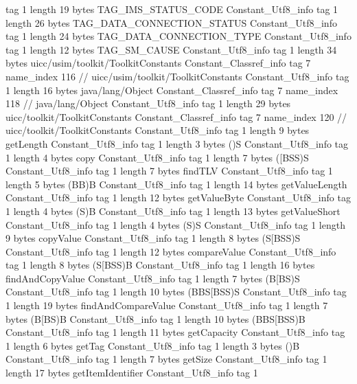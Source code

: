 {{{			tag	1
			length	19
			bytes	TAG_IMS_STATUS_CODE
		}
		Constant_Utf8_info {
			tag	1
			length	26
			bytes	TAG_DATA_CONNECTION_STATUS
		}
		Constant_Utf8_info {
			tag	1
			length	24
			bytes	TAG_DATA_CONNECTION_TYPE
		}
		Constant_Utf8_info {
			tag	1
			length	12
			bytes	TAG_SM_CAUSE
		}
		Constant_Utf8_info {
			tag	1
			length	34
			bytes	uicc/usim/toolkit/ToolkitConstants
		}
		Constant_Classref_info {
			tag	7
			name_index	116		// uicc/usim/toolkit/ToolkitConstants
		}
		Constant_Utf8_info {
			tag	1
			length	16
			bytes	java/lang/Object
		}
		Constant_Classref_info {
			tag	7
			name_index	118		// java/lang/Object
		}
		Constant_Utf8_info {
			tag	1
			length	29
			bytes	uicc/toolkit/ToolkitConstants
		}
		Constant_Classref_info {
			tag	7
			name_index	120		// uicc/toolkit/ToolkitConstants
		}
		Constant_Utf8_info {
			tag	1
			length	9
			bytes	getLength
		}
		Constant_Utf8_info {
			tag	1
			length	3
			bytes	()S
		}
		Constant_Utf8_info {
			tag	1
			length	4
			bytes	copy
		}
		Constant_Utf8_info {
			tag	1
			length	7
			bytes	([BSS)S
		}
		Constant_Utf8_info {
			tag	1
			length	7
			bytes	findTLV
		}
		Constant_Utf8_info {
			tag	1
			length	5
			bytes	(BB)B
		}
		Constant_Utf8_info {
			tag	1
			length	14
			bytes	getValueLength
		}
		Constant_Utf8_info {
			tag	1
			length	12
			bytes	getValueByte
		}
		Constant_Utf8_info {
			tag	1
			length	4
			bytes	(S)B
		}
		Constant_Utf8_info {
			tag	1
			length	13
			bytes	getValueShort
		}
		Constant_Utf8_info {
			tag	1
			length	4
			bytes	(S)S
		}
		Constant_Utf8_info {
			tag	1
			length	9
			bytes	copyValue
		}
		Constant_Utf8_info {
			tag	1
			length	8
			bytes	(S[BSS)S
		}
		Constant_Utf8_info {
			tag	1
			length	12
			bytes	compareValue
		}
		Constant_Utf8_info {
			tag	1
			length	8
			bytes	(S[BSS)B
		}
		Constant_Utf8_info {
			tag	1
			length	16
			bytes	findAndCopyValue
		}
		Constant_Utf8_info {
			tag	1
			length	7
			bytes	(B[BS)S
		}
		Constant_Utf8_info {
			tag	1
			length	10
			bytes	(BBS[BSS)S
		}
		Constant_Utf8_info {
			tag	1
			length	19
			bytes	findAndCompareValue
		}
		Constant_Utf8_info {
			tag	1
			length	7
			bytes	(B[BS)B
		}
		Constant_Utf8_info {
			tag	1
			length	10
			bytes	(BBS[BSS)B
		}
		Constant_Utf8_info {
			tag	1
			length	11
			bytes	getCapacity
		}
		Constant_Utf8_info {
			tag	1
			length	6
			bytes	getTag
		}
		Constant_Utf8_info {
			tag	1
			length	3
			bytes	()B
		}
		Constant_Utf8_info {
			tag	1
			length	7
			bytes	getSize
		}
		Constant_Utf8_info {
			tag	1
			length	17
			bytes	getItemIdentifier
		}
		Constant_Utf8_info {
			tag	1
}}}
